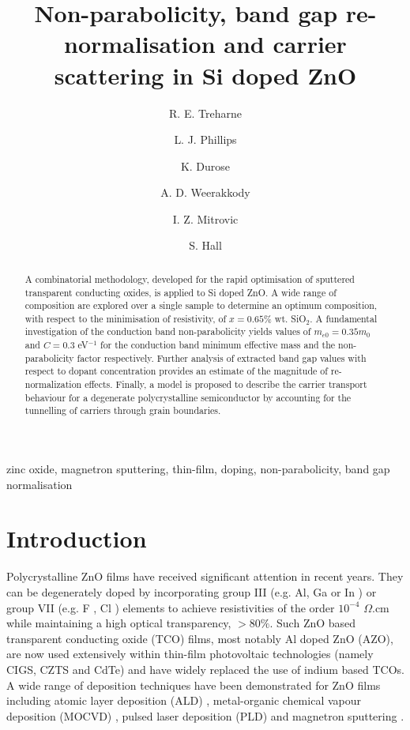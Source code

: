 \documentclass[preprint]{elsarticle}
\begin{document}
\begin{frontmatter}


\title{Non-parabolicity, band gap re-normalisation and carrier scattering in Si doped ZnO}
\author[label1]{R. E. Treharne}
\author[label1]{L. J. Phillips}
\author[label1]{K. Durose}
\address[label1]{Stephenson Institute for Renewable Energy, University of Liverpool, UK}
\author[label2]{A. D. Weerakkody}
\author[label2]{I. Z. Mitrovic}
\author[label2]{S. Hall}
\address[label2]{Department of Electrical Eng. and Electronics, University of Liverpool, UK}

\begin{abstract}
A combinatorial methodology, developed for the rapid optimisation of sputtered transparent conducting oxides, is applied to Si doped ZnO. A wide range of composition are explored over a single sample to determine an optimum composition, with respect to the minimisation of resistivity, of $x=0.65\%$ wt. SiO$_2$. A fundamental investigation of the conduction band non-parabolicity yields values of $m_{e0}=0.35m_0$ and $C=0.3$ eV$^{-1}$ for the conduction band minimum effective mass and the non-parabolicity factor respectively. Further analysis of extracted band gap values with respect to dopant concentration provides an estimate of the magnitude of re-normalization effects. Finally, a model is proposed to describe the carrier transport behaviour for a degenerate polycrystalline semiconductor by accounting for the tunnelling of carriers through grain boundaries.
\end{abstract}


\begin{keyword}
zinc oxide, magnetron sputtering, thin-film, doping, non-parabolicity, band gap normalisation
\end{keyword}

\end{frontmatter}

\linenumbers

\section{Introduction}

Polycrystalline ZnO films have received significant attention in recent years. They can be degenerately doped by incorporating group III (e.g. Al, Ga or In \cite{Minami2005}) or group VII (e.g. F \cite{Gordon1991, Treharne2010}, Cl \cite{Lincot2009}) elements to achieve resistivities of the order $10^{-4}$ $\Omega$.cm while maintaining a high optical transparency, $>80\%$. Such ZnO based transparent conducting oxide (TCO) films, most notably Al doped ZnO (AZO), are now used extensively within thin-film photovoltaic technologies (namely CIGS, CZTS and CdTe) and have widely replaced the use of indium based TCOs. A wide range of deposition techniques have been demonstrated for ZnO films including atomic layer deposition (ALD) \cite{Chalker2013}, metal-organic chemical vapour deposition (MOCVD) \cite{Myong1997}, pulsed laser deposition (PLD) \cite{Shin2006} and magnetron sputtering \cite{Minami2005, Minami2006, Ellmer2001}. 
\end{document}

